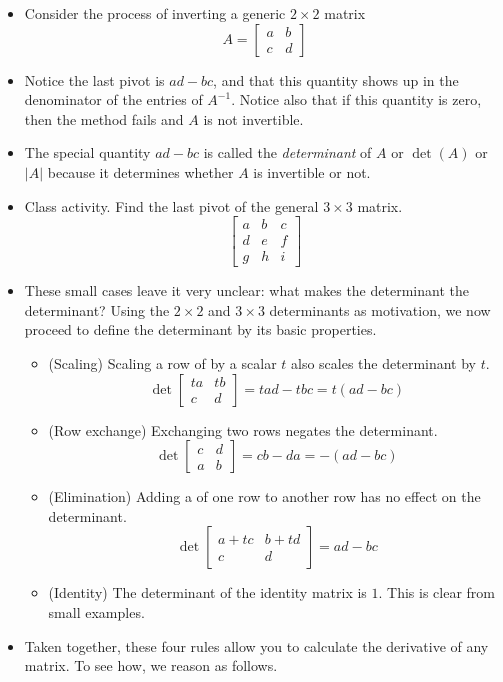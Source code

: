 \documentclass[11pt,oneside]{amsbook}
\theoremstyle{definition}
\theoremstyle{plain}
\theoremstyle{definition}
\theoremstyle{remark}
\numberwithin{equation}{section}
\numberwithin{figure}{section}
\begin{document}
\begin{itemize}
\item Consider the process of inverting a generic $2\times2$ matrix
  \[A=\begin{bmatrix}a&b\\c&d\end{bmatrix}
  \]
\item Notice the last pivot is $ad-bc$, and that this quantity shows up in the denominator of the entries of $A^{-1}$. Notice also that if this quantity is zero, then the method fails and $A$ is not invertible.
\item The special quantity $ad-bc$ is called the \emph{determinant} of $A$ or $\det(A)$ or $|A|$ because it determines whether $A$ is invertible or not.
\item Class activity. Find the last pivot of the general $3\times3$ matrix.
  \[\begin{bmatrix}a&b&c\\d&e&f\\g&h&i\end{bmatrix}
  \]
\item These small cases leave it very unclear: what makes the determinant the determinant? Using the $2\times2$ and $3\times3$ determinants as motivation, we now proceed to define the determinant by its basic properties.
  \begin{itemize}
  \item (Scaling) Scaling a row of by a scalar $t$ also scales the determinant by $t$.
    \[\det\begin{bmatrix}ta&tb\\c&d\end{bmatrix}
      =tad-tbc=t(ad-bc)
    \]
  \item (Row exchange) Exchanging two rows negates the determinant.
    \[\det\begin{bmatrix}c&d\\a&b\end{bmatrix}
      =cb-da=-(ad-bc)
    \]
  \item (Elimination) Adding a of one row to another row has no effect on the determinant.
    \[\det\begin{bmatrix}a+tc&b+td\\c&d\end{bmatrix}
      =ad-bc
    \]
  \item (Identity) The determinant of the identity matrix is $1$. This is clear from small examples.
  \end{itemize}
\item Taken together, these four rules allow you to calculate the derivative of any matrix. To see how, we reason as follows.

\end{itemize}
\end{document}
